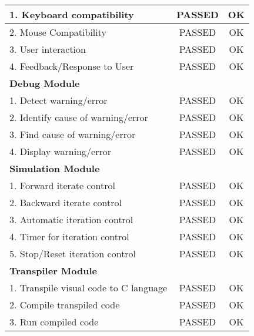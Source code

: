 \begin{longtable}[c]{|l|c|c|}
1. Keyboard compatibility                    & PASSED                 & OK               \\ \hline
2. Mouse Compatibility                       & PASSED                 & OK               \\ \hline
3. User interaction                          & PASSED                 & OK               \\ \hline
4. Feedback/Response to User                 & PASSED                 & OK               \\ \hline
\multicolumn{3}{|l|}{\textbf{Debug Module}}                                              \\ \hline
1. Detect warning/error                      & PASSED                 & OK               \\ \hline
2. Identify cause of warning/error           & PASSED                 & OK               \\ \hline
3. Find cause of warning/error               & PASSED                 & OK               \\ \hline
4. Display warning/error                     & PASSED                 & OK               \\ \hline
\multicolumn{3}{|l|}{\textbf{Simulation Module}}                                         \\ \hline
1. Forward iterate control                   & PASSED                 & OK               \\ \hline
2. Backward iterate control                  & PASSED                 & OK               \\ \hline
3. Automatic iteration control               & PASSED                 & OK               \\ \hline
4. Timer for iteration control               & PASSED                 & OK               \\ \hline
5. Stop/Reset iteration control              & PASSED                 & OK               \\ \hline
\multicolumn{3}{|l|}{\textbf{Transpiler Module}}                                         \\ \hline
1. Transpile visual code to C language       & PASSED                 & OK               \\ \hline
2. Compile transpiled code                   & PASSED                 & OK               \\ \hline
3. Run compiled code                         & PASSED                 & OK               \\ \hline

\end{longtable}

